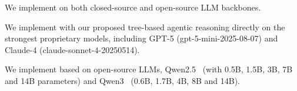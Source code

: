 



We implement \sys on both closed-source and open-source LLM backbones.

We implement \sys with our proposed tree-based agentic reasoning directly on the strongest proprietary models, including GPT-5 (\ie gpt-5-mini-2025-08-07) and Claude-4 (\ie claude-sonnet-4-20250514).

We implement \sys based on open-source LLMs, \ie Qwen2.5~\cite{hui2024qwen2} (with {0.5B}, {1.5B}, {3B}, {7B} and 14B parameters) and Qwen3~\cite{yang2025qwen3} ({0.6B}, {1.7B}, {4B}, {8B} and 14B). 
